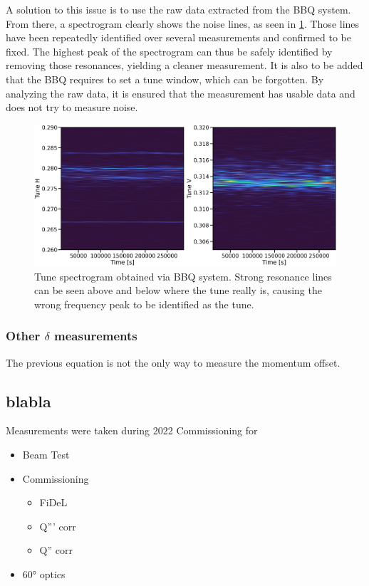 A solution to this issue is to use the raw data extracted from the BBQ system. From there, a
spectrogram clearly shows the noise lines, as seen in \cref{fig:decapoles:chromaticity:spectrogram}.
Those lines have been repeatedly identified over several measurements and confirmed to be fixed.
The highest peak of the spectrogram can thus be safely identified by removing those resonances,
yielding a cleaner measurement. It is also to be added that the BBQ requires to set a tune window,
which can be forgotten. By analyzing the raw data, it is ensured that the measurement has usable
data and does not try to measure noise.

\begin{figure}[H]
    \includegraphics[width=\textwidth]{./images/spectrogram.png}
    \caption{Tune spectrogram obtained via BBQ system. Strong resonance lines can be seen above and
    below where the tune really is, causing the wrong frequency peak to be identified as the tune.}
    \label{fig:decapoles:chromaticity:spectrogram}
\end{figure}


\subsubsection{Other $\delta$ measurements}

The previous equation is not the only way to measure the momentum offset.
\\


\subsection{blabla}

Measurements were taken during 2022 Commissioning for 
\begin{itemize}
    \item Beam Test
    \item Commissioning
    \begin{itemize}
        \item FiDeL
        \item Q''' corr
        \item Q'' corr
    \end{itemize}
    \item 60° optics
\end{itemize}

